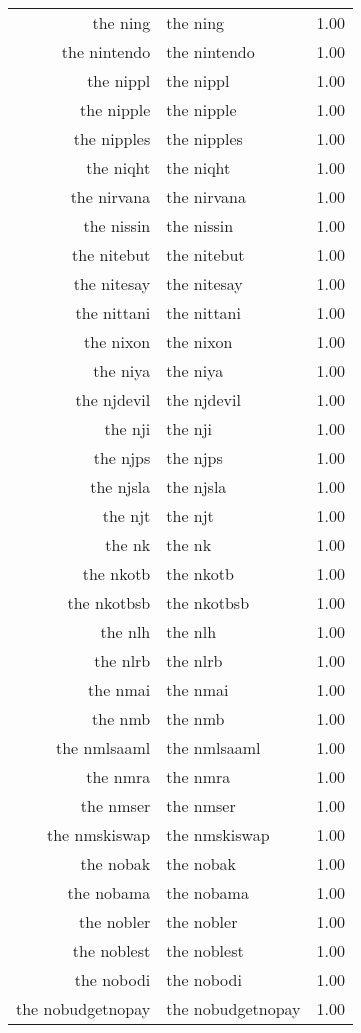 \begin{table}[ht]
\begin{tabular}{rlr}
  the ning & the ning & 1.00 \\ 
  the nintendo & the nintendo & 1.00 \\ 
  the nippl & the nippl & 1.00 \\ 
  the nipple & the nipple & 1.00 \\ 
  the nipples & the nipples & 1.00 \\ 
  the niqht & the niqht & 1.00 \\ 
  the nirvana & the nirvana & 1.00 \\ 
  the nissin & the nissin & 1.00 \\ 
  the nitebut & the nitebut & 1.00 \\ 
  the nitesay & the nitesay & 1.00 \\ 
  the nittani & the nittani & 1.00 \\ 
  the nixon & the nixon & 1.00 \\ 
  the niya & the niya & 1.00 \\ 
  the njdevil & the njdevil & 1.00 \\ 
  the nji & the nji & 1.00 \\ 
  the njps & the njps & 1.00 \\ 
  the njsla & the njsla & 1.00 \\ 
  the njt & the njt & 1.00 \\ 
  the nk & the nk & 1.00 \\ 
  the nkotb & the nkotb & 1.00 \\ 
  the nkotbsb & the nkotbsb & 1.00 \\ 
  the nlh & the nlh & 1.00 \\ 
  the nlrb & the nlrb & 1.00 \\ 
  the nmai & the nmai & 1.00 \\ 
  the nmb & the nmb & 1.00 \\ 
  the nmlsaaml & the nmlsaaml & 1.00 \\ 
  the nmra & the nmra & 1.00 \\ 
  the nmser & the nmser & 1.00 \\ 
  the nmskiswap & the nmskiswap & 1.00 \\ 
  the nobak & the nobak & 1.00 \\ 
  the nobama & the nobama & 1.00 \\ 
  the nobler & the nobler & 1.00 \\ 
  the noblest & the noblest & 1.00 \\ 
  the nobodi & the nobodi & 1.00 \\ 
  the nobudgetnopay & the nobudgetnopay & 1.00 \\ 

\end{tabular}
\end{table}
